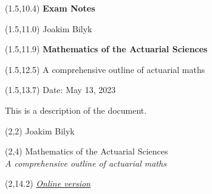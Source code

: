 \documentclass[a4paper,12pt,openany]{book}
\begin{document}
\thispagestyle{empty}

\begin{textblock}{12}(1.5,10.4) \noindent\fontsize{20}{20}\selectfont \textbf{Exam Notes}
\end{textblock}

\begin{textblock}{12}(1.5,11.0) \noindent\fontsize{14}{14}\selectfont Joakim Bilyk
\end{textblock}

\begin{textblock}{12}(1.5,11.9)
\noindent\fontsize{20}{20}\selectfont \textbf{Mathematics of the Actuarial Sciences}
\end{textblock}

\begin{textblock}{12}(1.5,12.5)
    \noindent\fontsize{14}{14}\selectfont A comprehensive outline of actuarial maths
\end{textblock}

\begin{textblock}{12}(1.5,13.7)
\noindent\fontsize{11}{11}\selectfont Date: May 13, 2023
\end{textblock}

\hspace{1pt}
\newpage

\onehalfspacing
\thispagestyle{empty}
\noindent

This is a description of the document.

\newpage

\thispagestyle{empty}

\begin{textblock}{12}(2,2)
\noindent\fontsize{20}{20}\selectfont Joakim Bilyk
\end{textblock}

\begin{textblock}{12}(2,4)
\noindent\fontsize{35pt}{40pt}\selectfont Mathematics of the Actuarial Sciences\\
\fontsize{20pt}{40pt}\selectfont \emph{A comprehensive outline of actuarial maths}
\end{textblock}

\begin{textblock}{12}(2,14.2)
\noindent\fontsize{16}{11}\selectfont \emph{\href{https://joakim-bilyk.github.io/books/exam}{Online version}}
\end{textblock}
\end{document}
